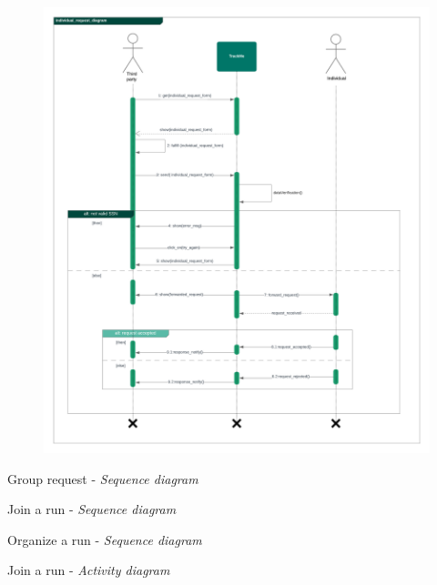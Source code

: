 \documentclass{article}
\begin{document}
\begin{legal}
\begin{legal}
\begin{legal}
{\begin{legal}
\begin{figure}[H]
  				\includegraphics[width=\linewidth]{./images/seq-diagrams/Individual_request_diagram.png}
				\end{figure}
			\item Group request - \textit{ Sequence diagram}
				\begin{figure}[H]
				\end{figure}
			\item Join a run  - \textit{ Sequence diagram}
				\begin{figure}[H]
				\end{figure}
			\item Organize a run - \textit{ Sequence diagram}
				\begin{figure}[H]
				\end{figure}
			\item Join a run  - \textit{ Activity diagram}
				\begin{figure}[H]
				\center

\end{figure}
\end{legal}}
\end{legal}
\end{legal}
\end{legal}
\end{document}
